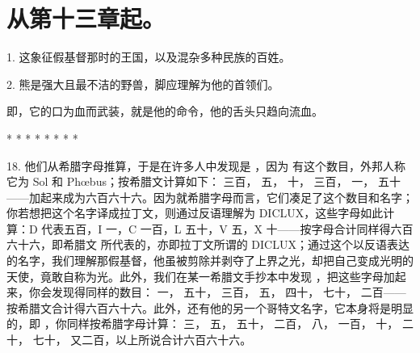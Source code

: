 
\section{从第十三章起。}

1.  这象征假基督那时的王国，以及混杂多种民族的百姓。\par

2.  熊是强大且最不洁的野兽，脚应理解为他的首领们。\par

 即，它的口为血而武装，就是他的命令，他的舌头只趋向流血。\par

* * * * * * * *\par

18.  他们从希腊字母推算，于是在许多人中发现是 ，因为  有这个数目，外邦人称它为 Sol 和 Phœbus；按希腊文计算如下： 三百， 五， 十， 三百， 一， 五十——加起来成为六百六十六。因为就希腊字母而言，它们凑足了这个数目和名字；你若想把这个名字译成拉丁文，则通过反语理解为 DICLUX，这些字母如此计算：D 代表五百，I 一，C 一百，L 五十，V 五，X 十——按字母合计同样得六百六十六，即希腊文  所代表的，亦即拉丁文所谓的 DICLUX；通过这个以反语表达的名字，我们理解那假基督，他虽被剪除并剥夺了上界之光，却把自己变成光明的天使，竟敢自称为光。此外，我们在某一希腊文手抄本中发现 ，把这些字母加起来，你会发现得同样的数目： 一， 五十， 三百， 五， 四十， 七十， 二百——按希腊文合计得六百六十六。此外，还有他的另一个哥特文名字，它本身将是明显的，即 ，你同样按希腊字母计算： 三， 五， 五十， 二百， 八， 一百， 十， 二十， 七十， 又二百，以上所说合计六百六十六。\par

